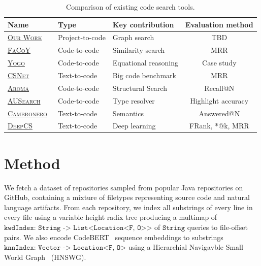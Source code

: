 \documentclass[11pt]{article}
\begin{document}
{ %
\renewcommand{\arraystretch}{1.5}
\begin{table}[H]
  \small
  \begin{tabular}{lllc}
    Name & Type & Key contribution & Evaluation method \\
    \hline
    \href{https://github.com/breandan/gym-fs}{\textsc{Our Work}}~\citep{kim2018facoy} & Project-to-code & Graph search & TBD \\
    \href{https://core.ac.uk/download/pdf/162022846.pdf#page=7}{\textsc{FaCoY}}~\citep{kim2018facoy} & Code-to-code & Similarity search & MRR \\
    \href{http://www.jameskoppel.com/files/papers/yogo-preprint.pdf#page=11}{\textsc{Yogo}}~\cite{premtoon2020semantic}     & Code-to-code & Equational reasoning & Case study \\
    \href{https://arxiv.org/pdf/1909.09436.pdf#page=5}{\textsc{CSNet}}~\citep{husain2019codesearchnet}     & Text-to-code & Big code benchmark & MRR \\
    \href{https://arxiv.org/pdf/1812.01158.pdf#section.5}{\textsc{Aroma}}~\citep{luan2019aroma}     & Code-to-code & Structural Search& Recall@N \\
    \href{https://raw.githubusercontent.com/mhilmiasyrofi/AUSearch/master/SANER_2020_AUSearch.pdf}{\textsc{AUSearch}}~\citep{asyrofi2020ausearch}     & Code-to-code & Type resolver & Highlight accuracy \\

    \href{https://arxiv.org/pdf/1905.03813.pdf#section.4}{\textsc{Cambronero}}~\citep{cambronero2019deep}     & Text-to-code & Semantics & Answered@N \\
    \href{https://guxd.github.io/papers/deepcs.pdf#section.5}{\textsc{DeepCS}}~\citep{gu2018deep}     & Text-to-code & Deep learning & FRank, *@k, MRR \\
  \end{tabular}
  \caption{\label{tab:ad_comparison} Comparison of existing code search tools.}
\end{table}
}

\section{Method}

We fetch a dataset of repositories sampled from popular Java repositories on GitHub, containing a mixture of filetypes representing source code and natural language artifacts. From each repository, we index all substrings of every line in every file using a variable height radix tree producing a multimap of $\texttt{kwdIndex: String -> List<Location<F, O>>}$ of $\texttt{String}$  queries to file-offset pairs. We also encode CodeBERT~\citep{feng2020codebert} sequence embeddings to substrings $\texttt{knnIndex: Vector -> Location<F, O>}$ using a Hierarchial Navigavble Small World Graph~\citep{malkov2018efficient} (HNSWG).
\end{document}
